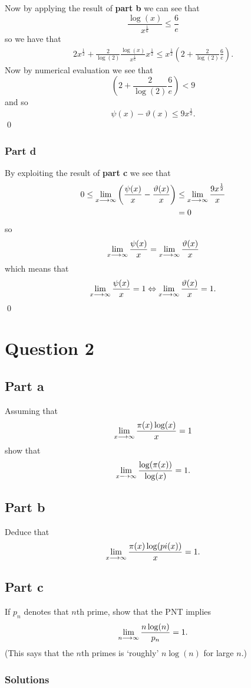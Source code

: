 \documentclass{unswmaths}
\begin{document}
Now by applying the result of \textbf{part b} we can see that
$$
	\frac{\log(x)}{x^\frac{1}{6}} \leq \frac{6}{e}
$$
so we have that 
\begin{align*}
	2x^\frac{1}{2} + \frac{2}{\log(2)} \frac{\log(x)}{x^\frac{1}{6}} x^\frac{1}{2} \leq x^\frac{1}{2} \left( 2 + \frac{2}{\log(2)} \frac{6}{e} \right).
\end{align*}
Now by numerical evaluation we see that 
$$
	\left( 2 + \frac{2}{\log(2)} \frac{6}{e} \right) < 9
$$
and so 
$$
	\psi(x) - \vartheta(x) \leq 9x^\frac{1}{2}.
$$
\qed
\subsubsection*{Part d}
By exploiting the result of \textbf{part c} we see that
\begin{align*}
	0 \leq \lim_{x \longrightarrow \infty} \left( \frac{\psi(x)}{x} - \frac{\vartheta(x)}{x}\right) &\leq \lim_{x \longrightarrow \infty} \frac{9x^\frac{1}{2}}{x} \\
		&= 0
\end{align*}
so 
$$
	\lim_{x \longrightarrow \infty} \frac{\psi(x)}{x} = \lim_{x \longrightarrow \infty} \frac{\vartheta(x)}{x}
$$
which means that
$$
	\lim_{x \longrightarrow \infty} \frac{\psi(x)}{x} = 1 \Leftrightarrow \lim_{x \longrightarrow \infty} \frac{\vartheta(x)}{x} = 1.
$$
\qed
\section*{Question 2}

\subsection*{Part a}
Assuming that 
$$
	\lim_{x \longrightarrow \infty} \frac{\pi(x)\log(x)}{x} = 1
$$
show that
$$
	\lim_{x \longrightarrow \infty} \frac{\log(\pi(x))}{\log(x)} = 1.
$$
\subsection*{Part b}
Deduce that 
$$
	\lim_{x \longrightarrow \infty} \frac{\pi(x)\log(pi(x))}{x} = 1.
$$

\subsection*{Part c}
If $ p_n $ denotes that $n$th prime, show that the PNT implies 
$$
	\lim_{n \longrightarrow \infty } \frac{n \log(n)}{p_n} = 1.
$$
(This says that the $n$th primes is `roughly' $ n\log(n) $ for large $n$.)

\subsubsection*{Solutions}
\end{document}
